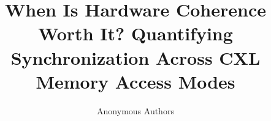 \documentclass[sigplan,twocolumn,review,anonymous]{acmart}
\begin{document}


\title{When Is Hardware Coherence Worth It? Quantifying Synchronization Across CXL Memory Access Modes}

\author{Anonymous Authors}

\maketitle












\end{document}
